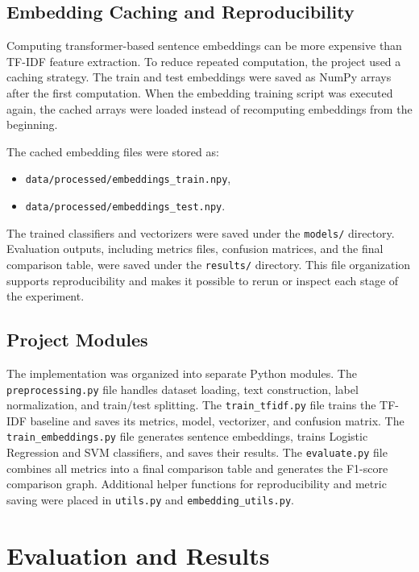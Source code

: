 \documentclass[11pt]{article}
\begin{document}
\subsection{Embedding Caching and Reproducibility}

Computing transformer-based sentence embeddings can be more expensive than TF-IDF feature extraction. To reduce repeated computation, the project used a caching strategy. The train and test embeddings were saved as NumPy arrays after the first computation. When the embedding training script was executed again, the cached arrays were loaded instead of recomputing embeddings from the beginning.

The cached embedding files were stored as:

\begin{itemize}
    \item \texttt{data/processed/embeddings\_train.npy},
    \item \texttt{data/processed/embeddings\_test.npy}.
\end{itemize}

The trained classifiers and vectorizers were saved under the \texttt{models/} directory. Evaluation outputs, including metrics files, confusion matrices, and the final comparison table, were saved under the \texttt{results/} directory. This file organization supports reproducibility and makes it possible to rerun or inspect each stage of the experiment.

\subsection{Project Modules}

The implementation was organized into separate Python modules. The \texttt{preprocessing.py} file handles dataset loading, text construction, label normalization, and train/test splitting. The \texttt{train\_tfidf.py} file trains the TF-IDF baseline and saves its metrics, model, vectorizer, and confusion matrix. The \texttt{train\_embeddings.py} file generates sentence embeddings, trains Logistic Regression and SVM classifiers, and saves their results. The \texttt{evaluate.py} file combines all metrics into a final comparison table and generates the F1-score comparison graph. Additional helper functions for reproducibility and metric saving were placed in \texttt{utils.py} and \texttt{embedding\_utils.py}.

\section{Evaluation and Results}
\end{document}
